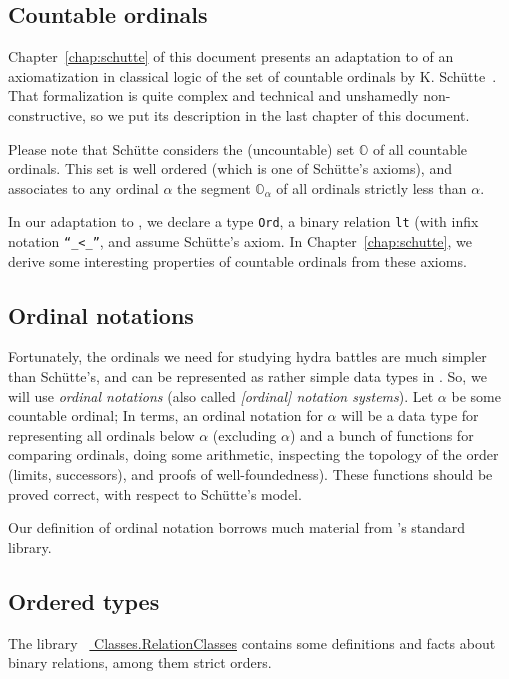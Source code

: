\subsection{Countable ordinals}

Chapter~\ref{chap:schutte} of this document presents an adaptation to \coq{} of an axiomatization in classical logic of the set of countable ordinals by K. Schütte~\cite{schutte}. 
That formalization is quite complex and technical and unshamedly non-constructive,  so we put its description  in the last chapter of this document. 

Please note that Schütte considers the (uncountable) set $\mathbb{O}$ of all countable ordinals. This set is well ordered (which is one of Schütte's axioms), and associates to any ordinal $\alpha$ the segment $\mathbb{O}_\alpha$ of all ordinals strictly less than $\alpha$.

In our adaptation to \coq{}, we declare a type \texttt{Ord}, a binary relation \texttt{lt} (with infix notation \texttt{``\_<\_''}, and assume Schütte's axiom. In Chapter~\ref{chap:schutte},
we derive some interesting properties of countable ordinals from these axioms.


\subsection{Ordinal notations}


Fortunately, the ordinals we need for  studying hydra battles are much simpler than Schütte's, and can be represented as rather simple data types in \gallina. So, we will use \emph{ordinal notations} (also called \emph{[ordinal] notation systems}). Let $\alpha$ be some countable ordinal; In \coq{} terms, an ordinal notation for $\alpha$ will be a data type for representing all ordinals below $\alpha$ (excluding $\alpha$) and a bunch of functions for comparing ordinals, doing some arithmetic, inspecting the topology of the order (limits, successors), and proofs of well-foundedness). These functions should be proved correct, with respect to Schütte's model.

Our definition of ordinal notation borrows much material from \coq's standard library.



\subsection{Ordered types}

The library ~\href{https://coq.inria.fr/distrib/current/stdlib/Coq.Classes.RelationClasses.html}{%
Classes.RelationClasses} contains some definitions and facts about binary relations, among them strict orders.

